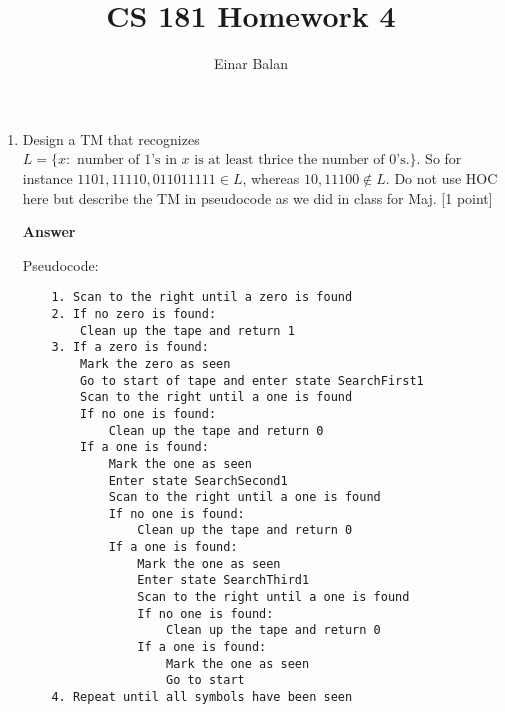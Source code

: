 \documentclass[11pt]{article}
\title{\bf{CS 181 Homework 4}}
\author{ Einar Balan}
\date{}
\newcommand \kw[1]{\textbf{#1}}
\newenvironment{answer}{
\vspace{.5cm}
\begin{mdframed}[]
    \kw{Answer} 
}
{
\end{mdframed}
\pagebreak
}
\begin{document}
\maketitle

\begin{enumerate}

\item Design a TM that recognizes $L = \{x: \text{ number of $1$'s in $x$ is at least thrice the number of $0$'s.}\}$. So for instance $1101, 11110,011011111 \in L$, whereas $10,11100 \notin L$.  Do not use HOC here but describe the TM in pseudocode as we did in class for Maj. [1 point] 


\begin{answer}
    
    Pseudocode$:$
    \begin{verbatim}
    1. Scan to the right until a zero is found
    2. If no zero is found:
        Clean up the tape and return 1 
    3. If a zero is found: 
        Mark the zero as seen
        Go to start of tape and enter state SearchFirst1
        Scan to the right until a one is found
        If no one is found:
            Clean up the tape and return 0
        If a one is found:
            Mark the one as seen
            Enter state SearchSecond1
            Scan to the right until a one is found
            If no one is found:
                Clean up the tape and return 0
            If a one is found:
                Mark the one as seen
                Enter state SearchThird1
                Scan to the right until a one is found
                If no one is found:
                    Clean up the tape and return 0
                If a one is found:
                    Mark the one as seen
                    Go to start 
    4. Repeat until all symbols have been seen


\end{verbatim}
\end{answer}
\end{enumerate}
\end{document}
